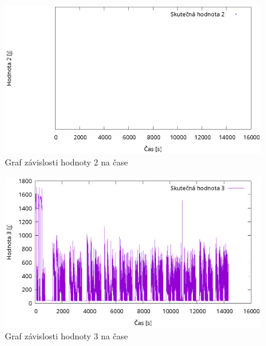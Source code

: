 \documentclass{article}
\begin{document}
\begin{figure}[h]
    \centering
    \includegraphics[]{plots/plot2.eps}
    \caption{\label{fig:plot2}Graf závislosti hodnoty 2 na čase}
\end{figure}

\begin{figure}[h]
    \centering
    \includegraphics[]{plots/plot3.eps}
    \caption{\label{fig:plot3}Graf závislosti hodnoty 3 na čase}
\end{figure}
\end{document}
